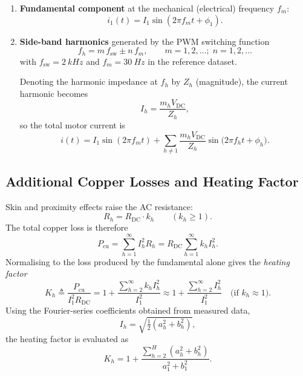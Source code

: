 \documentclass[nohyper,nobib,xcolor=dvipsnames,svgnames,x11names]{tufte-book}
\begin{document}
\begin{enumerate}
  \item \textbf{Fundamental component} at the mechanical (electrical) frequency $f_{m}$:
        \begin{equation}
          i_{1}(t)=I_{1}\sin(2\pi f_{m}t+\phi_{1}).
        \end{equation}

  \item \textbf{Side-band harmonics} generated by the PWM switching function
        \begin{equation}
          f_{h}=m\,f_{\text{sw}}\pm n\,f_{m},\qquad m=1,2,\dots;\;n=1,2,\dots
        \end{equation}
        with $f_{\text{sw}}=\SI{2}{kHz}$ and $f_{m}=\SI{30}{Hz}$ in the reference dataset.

        Denoting the harmonic impedance at $f_{h}$ by $Z_{h}$ (magnitude), the current harmonic becomes
        \begin{equation}
          I_{h}=\frac{m_{h}V_{\text{DC}}}{Z_{h}},
        \end{equation}
        so the total motor current is
        \begin{equation}
          i(t)=I_{1}\sin(2\pi f_{m}t)+\sum_{h\neq 1}\frac{m_{h}V_{\text{DC}}}{Z_{h}}
          \sin\!\bigl(2\pi f_{h}t+\phi_{h}\bigr).
        \end{equation}
\end{enumerate}

\subsection{Additional Copper Losses and Heating Factor}
Skin and proximity effects raise the AC resistance:
\begin{equation}
R_{h}=R_{\text{DC}}\cdot k_{h}\qquad(k_{h}\ge 1).
\end{equation}
The total copper loss is therefore
\begin{equation}
P_{\text{cu}}=\sum_{h=1}^{\infty}I_{h}^{2}R_{h}
=R_{\text{DC}}\sum_{h=1}^{\infty}k_{h}I_{h}^{2}.
\end{equation}
Normalising to the loss produced by the fundamental alone gives the \emph{heating factor}
\begin{equation}
K_{h}\triangleq\frac{P_{\text{cu}}}{I_{1}^{2}R_{\text{DC}}}
=1+\frac{\sum_{h=2}^{\infty}k_{h}I_{h}^{2}}{I_{1}^{2}}
\approx 1+\frac{\sum_{h=2}^{\infty}I_{h}^{2}}{I_{1}^{2}}
\quad\text{(if }k_{h}\approx 1\text{)}.
\end{equation}
Using the Fourier-series coefficients obtained from measured data,
\begin{equation}
I_{h}=\sqrt{\tfrac{1}{2}(a_{h}^{2}+b_{h}^{2})},
\end{equation}
the heating factor is evaluated as
\begin{equation}
K_{h}=1+\frac{\sum_{h=2}^{H}(a_{h}^{2}+b_{h}^{2})}{a_{1}^{2}+b_{1}^{2}}.
\end{equation}
\end{document}
